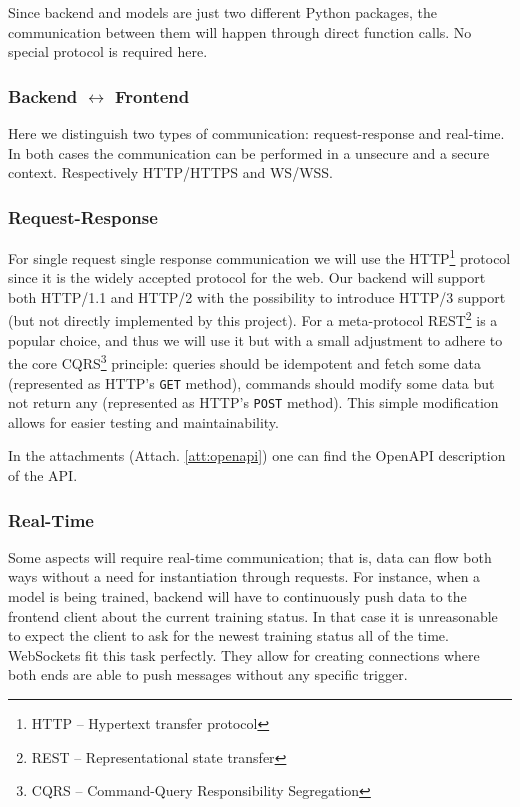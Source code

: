 \documentclass{article}
\begin{document}
Since backend and models are just two different Python packages, the communication between them will happen through direct function calls. No special protocol is required here.

\subsubsection{Backend \texorpdfstring{$\leftrightarrow$}{<->} Frontend}

Here we distinguish two types of communication: request-response and real-time. In both cases the communication can be performed in a unsecure and a secure context. Respectively HTTP/HTTPS and WS/WSS.

\subsubsection{Request-Response}

For single request single response communication we will use the HTTP\footnote{HTTP -- Hypertext transfer protocol} protocol since it is the widely accepted protocol for the web. Our backend will support both HTTP/1.1 and HTTP/2 with the possibility to introduce HTTP/3 support (but not directly implemented by this project). For a meta-protocol REST\footnote{REST -- Representational state transfer} is a popular choice, and thus we will use it but with a small adjustment to adhere to the core CQRS\cite{CQRS}\footnote{CQRS -- Command-Query Responsibility Segregation} principle: queries should be idempotent and fetch some data (represented as HTTP's \texttt{GET} method), commands should modify some data but not return any (represented as HTTP's \texttt{POST} method). This simple modification allows for easier testing and maintainability.

In the attachments (Attach. \ref{att:openapi}) one can find the OpenAPI description of the API.

\subsubsection{Real-Time}

Some aspects will require real-time communication; that is, data can flow both ways without a need for instantiation through requests. For instance, when a model is being trained, backend will have to continuously push data to the frontend client about the current training status. In that case it is unreasonable to expect the client to ask for the newest training status all of the time. WebSockets fit this task perfectly. They allow for creating connections where both ends are able to push messages without any specific trigger.
\end{document}
